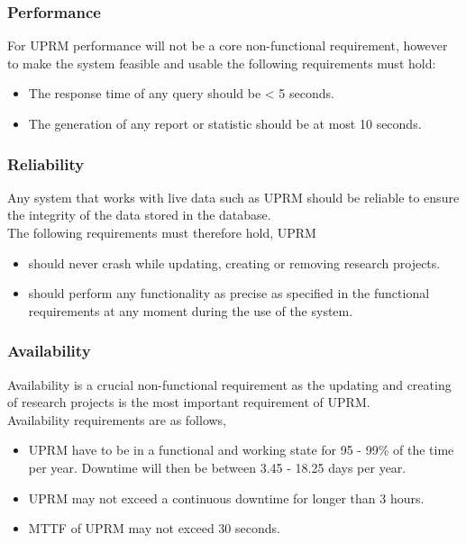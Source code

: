 
\subsubsection{Performance}
For UPRM performance will not be a core non-functional requirement, however to make the system feasible and usable the following requirements must hold:

\begin{itemize}
	\item The response time of any query should be \textless{}  5 seconds.
	\item The generation of any report or statistic should be at most 10 seconds.
\end{itemize}

\subsubsection{Reliability}
Any system that works with live data such as UPRM should be reliable to ensure the integrity of the data stored in the database.\\
 
The following requirements must therefore hold, UPRM 

\begin{itemize}
	\item should never crash while updating, creating or removing research projects.
	\item should perform any functionality as precise as specified in the functional requirements at any moment during the use of the system.
\end{itemize}

\subsubsection{Availability}
Availability is a crucial non-functional requirement as the updating and creating of research projects is the most important requirement of UPRM.\\

Availability requirements are as follows,

\begin{itemize}
	\item UPRM have to be in a functional and working state for 95 - 99\% of the time per year. Downtime will then be between 3.45 - 18.25 days per year.
	\item UPRM may not exceed a continuous downtime for longer than 3 hours.
	\item MTTF of UPRM may not exceed 30 seconds.
\end{itemize}

